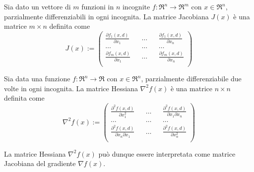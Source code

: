 \begin{definition}
	\label{dfn:jacobian-matrix}
	Sia dato un vettore di $m$ funzioni in $n$ incognite $f:\Re^{n}\rightarrow\Re^{m}$ con $x\in\Re^{n}$, parzialmente differenziabili in ogni incognita. La matrice Jacobiana $J(x)$ è una matrice $m\times n$ definita come
	\begin{equation}
	\label{eqn:jacobian-matrix}
	J(x):=
	\begin{pmatrix}
	\frac{\partial f_{1}(x,d)}{\partial x_{1}} && \ldots && \frac{\partial f_{1}(x,d)}{\partial x_{n}} \\
	\ldots && \ldots && \ldots \\
	\frac{\partial f_{m}(x,d)}{\partial x_{1}} && \ldots && \frac{\partial f_{m}(x,d)}{\partial x_{n}} \\
	\end{pmatrix}
	\end{equation}
\end{definition}

\begin{definition}
	\label{dfn:hexian-matrix}
	Sia data una funzione $f:\Re^{n}\rightarrow\Re$ con $x\in\Re^{n}$, parzialmente differenziabile due volte in ogni incognita. La matrice Hessiana $\nabla^{2}f(x)$ è una matrice $n\times n$ definita come
	\begin{equation}
	\label{eqn:hexian-matrix}
	\nabla^{2}f(x):=
	\begin{pmatrix}
	\frac{\partial^{2}f(x,d)}{\partial x_{1}^{2}} && \ldots && \frac{\partial^{2}f(x,d)}{\partial x_{1}\partial x_{n}} \\
	\ldots && \ldots && \ldots \\
	\frac{\partial^{2}f(x,d)}{\partial x_{n}\partial x_{1}} && \ldots && \frac{\partial^{2}f(x,d)}{\partial x_{n}^{2}} \\
	\end{pmatrix}
	\end{equation}
\end{definition}

La matrice Hessiana $\nabla^{2}f(x)$ può dunque essere interpretata come matrice Jacobiana del gradiente $\nabla f(x)$.
